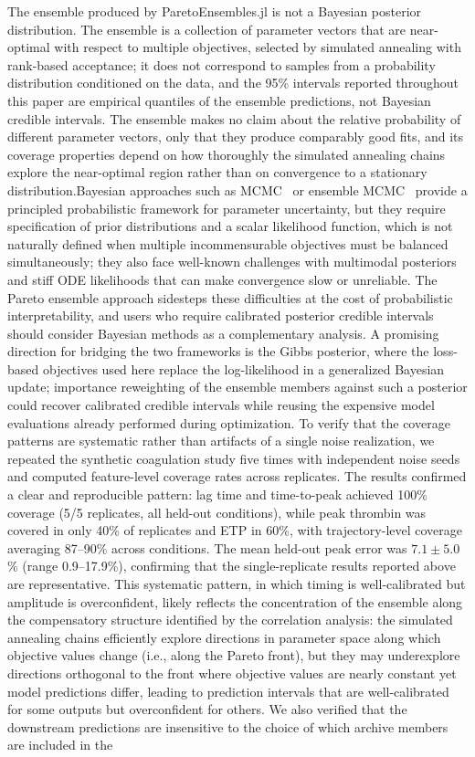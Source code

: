 \documentclass[12pt]{article}
\begin{document}
The ensemble produced by ParetoEnsembles.jl is not a Bayesian posterior distribution. The ensemble is a collection of parameter vectors that are near-optimal with respect to multiple objectives, selected by simulated annealing with rank-based acceptance; it does not correspond to samples from a probability distribution conditioned on the data, and the 95\% intervals reported throughout this paper are empirical quantiles of the ensemble predictions, not Bayesian credible intervals. The ensemble makes no claim about the relative probability of different parameter vectors, only that they produce comparably good fits, and its coverage properties depend on how thoroughly the simulated annealing chains explore the near-optimal region rather than on convergence to a stationary distribution.Bayesian approaches such as MCMC~\cite{Carpenter2017,Ge2018} or ensemble MCMC~\cite{ForemanMackey2013} provide a principled probabilistic framework for parameter uncertainty, but they require specification of prior distributions and a scalar likelihood function, which is not naturally defined when multiple incommensurable objectives must be balanced simultaneously; they also face well-known challenges with multimodal posteriors and stiff ODE likelihoods that can make convergence slow or unreliable. The Pareto ensemble approach sidesteps these difficulties at the cost of probabilistic interpretability, and users who require calibrated posterior credible intervals should consider Bayesian methods as a complementary analysis. A promising direction for bridging the two frameworks is the Gibbs posterior, where the loss-based objectives used here replace the log-likelihood in a generalized Bayesian update; importance reweighting of the ensemble members against such a posterior could recover calibrated credible intervals while reusing the expensive model evaluations already performed during optimization. To verify that the coverage patterns are systematic rather than artifacts of a single noise realization, we repeated the synthetic coagulation study five times with independent noise seeds and computed feature-level coverage rates across replicates. The results confirmed a clear and reproducible pattern: lag time and time-to-peak achieved 100\% coverage (5/5 replicates, all held-out conditions), while peak thrombin was covered in only 40\% of replicates and ETP in 60\%, with trajectory-level coverage averaging 87--90\% across conditions. The mean held-out peak error was $7.1 \pm 5.0$\% (range 0.9--17.9\%), confirming that the single-replicate results reported above are representative. This systematic pattern, in which timing is well-calibrated but amplitude is overconfident, likely reflects the concentration of the ensemble along the compensatory structure identified by the correlation analysis: the simulated annealing chains efficiently explore directions in parameter space along which objective values change (i.e., along the Pareto front), but they may underexplore directions orthogonal to the front where objective values are nearly constant yet model predictions differ, leading to prediction intervals that are well-calibrated for some outputs but overconfident for others. We also verified that the downstream predictions are insensitive to the choice of which archive members are included in the 
\end{document}
